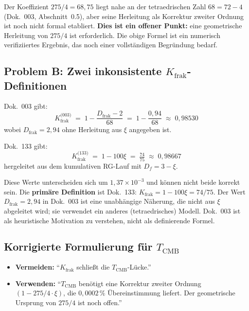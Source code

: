 Der Koeffizient $275/4 = 68{,}75$ liegt nahe an der tetraedrischen Zahl
$68 = 72 - 4$ (Dok.~003, Abschnitt~0.5), aber seine Herleitung als
Korrektur zweiter Ordnung ist noch nicht formal etabliert.
\textbf{Dies ist ein offener Punkt:} eine geometrische Herleitung
von $275/4$ ist erforderlich. Die obige Formel ist ein numerisch
verifiziiertes Ergebnis, das noch einer vollständigen Begründung bedarf.

\subsection*{Problem B: Zwei inkonsistente $K_\text{frak}$-Definitionen}

Dok.~003 gibt:
\begin{equation}
  K_\text{frak}^\text{(003)} \;=\; 1 - \frac{D_\text{frak} - 2}{68}
  \;=\; 1 - \frac{0{,}94}{68} \;\approx\; 0{,}98530
  \tag{190.18}
\end{equation}
wobei $D_\text{frak} = 2{,}94$ ohne Herleitung aus $\xi$ angegeben ist.

Dok.~133 gibt:
\begin{equation}
  K_\text{frak}^\text{(133)} \;=\; 1 - 100\xi \;=\; \tfrac{74}{75}
  \;\approx\; 0{,}98667
  \tag{190.19}
\end{equation}
hergeleitet aus dem kumulativen RG-Lauf mit $D_f = 3 - \xi$.

Diese Werte unterscheiden sich um $1{,}37 \times 10^{-3}$ und können
nicht beide korrekt sein. Die \textbf{primäre Definition} ist Dok.~133:
$K_\text{frak} = 1 - 100\xi = 74/75$. Der Wert $D_\text{frak} = 2{,}94$ in
Dok.~003 ist eine unabhängige Näherung, die nicht aus $\xi$ abgeleitet
wird; sie verwendet ein anderes (tetraedrisches) Modell.
Dok.~003 ist als heuristische Motivation zu verstehen, nicht als
definierende Formel.

\subsection*{Korrigierte Formulierung für $T_\text{CMB}$}

\begin{itemize}
  \item \textbf{Vermeiden:} \enquote{$K_\text{frak}$ schließt die
        $T_\text{CMB}$-Lücke.}
  \item \textbf{Verwenden:} \enquote{$T_\text{CMB}$ benötigt eine
        Korrektur zweiter Ordnung $(1 - 275/4\cdot\xi)$, die
        $0{,}0002\,\%$ Übereinstimmung liefert. Der geometrische
        Ursprung von $275/4$ ist noch offen.}
\end{itemize}


